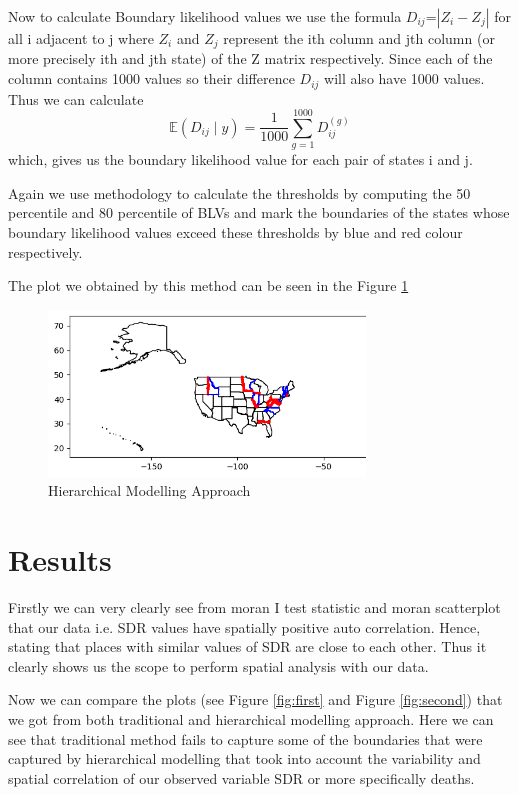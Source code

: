 \documentclass[enabledeprecatedfontcommands,parskip=half,twoside=semi,BCOR=0mm]{scrreprt}
\numberwithin{equation}{chapter}
\theoremstyle{definition}
\theoremstyle{remark}
\begin{document}
    Now to calculate Boundary likelihood values we use the formula
    \(D_{ij}\)=\(|Z_i-Z_j|\) for all i adjacent to j where \(Z_i\) and \(Z_j\) represent the ith column and jth column (or more precisely ith and jth state) of the Z matrix respectively. Since each of the column contains 1000 values so their difference \(D_{ij}\) will also have 1000 values. Thus we can calculate 
    \[
    \mathbb{E}(D_{ij} \mid y) = \frac{1}{1000} \sum_{g=1}^{1000} D_{ij}^{(g)}
    \]
    which, gives us the boundary likelihood value for each pair of states i and j.
    
    Again we use \cite{Lu_Carlin.2005} methodology to calculate the thresholds by computing the 50 percentile and 80 percentile of BLVs and mark the boundaries of the states whose boundary likelihood values exceed these thresholds by blue and red colour respectively.

    The plot we obtained by this method can be seen in the Figure \ref{fig:Figure 7}
    \begin{figure}[h]
    \centering
    \includegraphics[width=0.75\textwidth]{Hierarchical.png}
    \caption{Hierarchical Modelling Approach}
    \label{fig:Figure 7}
    \end{figure}

    \chapter{Results}
    Firstly we can very clearly see from moran I test statistic and moran scatterplot that our data i.e. SDR values have spatially positive auto correlation. Hence, stating that places with similar values of SDR are close to each other. Thus it clearly shows us the scope to perform spatial analysis with our data. 
    
    Now we can compare the plots (see Figure \ref{fig:first} and Figure \ref{fig:second}) that we got from both traditional and hierarchical modelling approach. Here we can see that traditional method fails to capture some of the boundaries that were captured by hierarchical modelling that took into account the variability and spatial correlation of our observed variable SDR or more specifically deaths.
   
\end{document}
